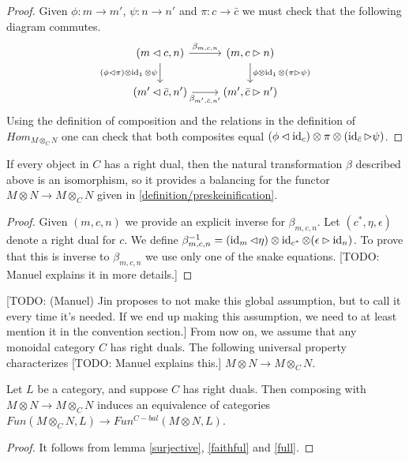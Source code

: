 \begin{proof}
  Given $\phi:m\to m'$, $\psi: n\to n'$ and $\pi:c\to \bar{c}$ we must check
  that the following diagram commutes.
  \[
    \begin{tikzcd}
      {(m\lhd c, n)} & {(m,c\rhd n)} \\
      {(m'\lhd \bar{c}, n')} & {(m',\bar{c}\rhd n')}
      \arrow["{\beta_{m,c,n}}", from=1-1, to=1-2]
      \arrow["{(\phi\lhd\pi)\otimes\id_1\otimes\psi}"', from=1-1, to=2-1]
      \arrow["{\phi\otimes\id_1\otimes(\pi\rhd\psi)}", from=1-2, to=2-2]
      \arrow["{\beta_{m',\bar{c},n'}}"', from=2-1, to=2-2]
    \end{tikzcd}
  \]
  Using the definition of composition and the relations in the definition of
  $Hom_{M\otimes_C N}$ one can check that both composites equal
  $(\phi\lhd\operatorname{id}_c)\otimes\pi\otimes(\operatorname{id}_{\bar{c}}\rhd\psi)$.
\end{proof}

\begin{lemma}\label{balanced}
  If every object in $C$ has a right dual, then the natural transformation
  $\beta$ described above is an isomorphism, so it provides a balancing for
  the functor $M\otimes N\to M\otimes_C N$ given in \ref{definition/preskeinification}.
\end{lemma}

\begin{proof}
  Given $(m,c,n)$ we provide an explicit inverse for $\beta_{m,c,n}$. Let
  $(c^*,\eta,\epsilon)$ denote a right dual for $c$. We define
  $\beta^{-1}_{m,c,n}=(\operatorname{id}_m\lhd\eta)\otimes\operatorname{id}_{c^*}\otimes (\epsilon\rhd\operatorname{id}_n)$.
  To prove that this is inverse to $\beta_{m,c,n}$ we use only one of the
  snake equations. [TODO: Manuel explains it in more details.]
\end{proof}

[TODO: (Manuel) Jin proposes to not make this global assumption, but to call it every
time it's needed. If we end up making this assumption, we need to at least
mention it in the convention section.]
From now on, we assume that any monoidal category $C$ has right duals. The following universal
property characterizes [TODO: Manuel explains this.] $M\otimes N \to M\otimes_C N$.

\begin{proposition}\label{univ_bal}
  Let $L$ be a category, and suppose $C$ has right duals. Then composing with
  $M\otimes N \to M\otimes_C N$ induces an equivalence of categories
  $Fun(M\otimes_C N,L)\to Fun^{C-bal}(M\otimes N,L)$.
\end{proposition}
\begin{proof}
  It follows from lemma \ref{surjective}, \ref{faithful} and \ref{full}.
\end{proof}

